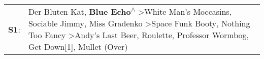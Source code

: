 \begin{supertabular}{p{0.03\textwidth}p{0.92\textwidth}}
 \textbf{S1}:  &  Der Bluten Kat\textsuperscript{}, \enspace \textbf{Blue Echo\textsuperscript{$\wedge$}} \textgreater \enspace White Man's Moccasins\textsuperscript{}, \enspace Sociable Jimmy\textsuperscript{}, \enspace Miss Gradenko\textsuperscript{} \textgreater \enspace Space Funk Booty\textsuperscript{}, \enspace Nothing Too Fancy\textsuperscript{} \textgreater \enspace Andy's Last Beer\textsuperscript{}, \enspace Roulette\textsuperscript{}, \enspace Professor Wormbog\textsuperscript{}, \enspace Get Down[1]\textsuperscript{}, \enspace Mullet (Over)\textsuperscript{}  \enspace  \\
\end{supertabular}
